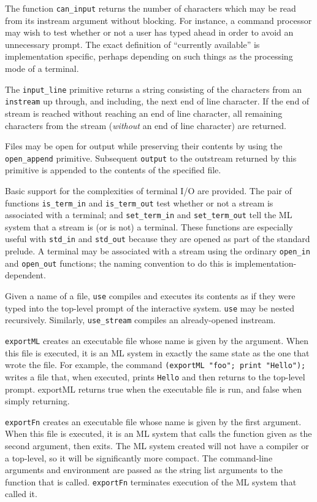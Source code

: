 The function \verb"can_input" returns the number of characters
which may be read from its instream argument without blocking.
For instance, a command processor may wish
to test whether or not a user has typed ahead in order to avoid an
unnecessary prompt.  The exact definition of ``currently available''
is implementation specific, perhaps depending on such things as the
processing mode of a terminal.

The \verb"input_line" primitive returns a string consisting of the
characters from an \verb"instream" up through, and including, the
next end of line character.  If the end of stream is reached without
reaching an end of line character, all remaining characters from the
stream ({\em without} an end of line character) are returned.

Files may be open for output while preserving their contents by using
the \verb"open_append" primitive.  Subsequent \verb"output" to the
outstream returned by this primitive is appended to the contents of
the specified file.

Basic support for the complexities of terminal I/O are provided.  The
pair of functions \verb"is_term_in" and \verb"is_term_out" test
whether or not a stream is associated with a terminal; and \verb"set_term_in"
and \verb"set_term_out" tell the ML system that a stream is (or is not)
a terminal.  These
functions are especially useful with \verb"std_in" and \verb"std_out"
because they are opened as part of the standard prelude.  A terminal
may be associated with a stream using the ordinary \verb"open_in" and
\verb"open_out" functions; the naming convention to do this is
implementation-dependent.  

Given a name of a file, \verb"use" compiles
and executes its contents as if they were typed into the top-level
prompt of the interactive system.  \verb"use" may be nested
recursively.  Similarly, \verb"use_stream"
compiles an already-opened instream.

\verb"exportML" creates an executable file whose name is
given by the argument.  When this file is executed, it is an ML
system in exactly the same state as the one that wrote the file.  For
example, the command
\verb|(exportML "foo"; print "Hello");| writes a file that, when
executed, prints \verb"Hello" and then returns to the top-level
prompt.  exportML returns true when the executable file is run,
and false when simply returning.

\verb"exportFn"  creates an executable file whose name is given
by the first argument.  When this file is executed, it is an ML
system that calls the function given as the second argument, then
exits.  The ML system created will not have a compiler or a
top-level, so it will be significantly more compact.
The command-line arguments and environment
are passed as the string list arguments to the
function that is called.   \verb"exportFn" terminates
execution of the ML system that called it.

